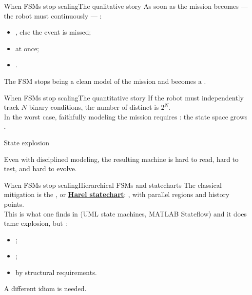 \begin{frame}{When FSMs stop scaling}{The qualitative story}
  \justifying
  As soon as the mission becomes  --- the robot must continuously  --- :
  \begin{itemize}
    \item {}, else the event is missed;
    \item {} at once;
    \item {}.
  \end{itemize}
  \bigskip
  The FSM stops being a clean model of the mission and becomes a .
\end{frame}
\begin{frame}{When FSMs stop scaling}{The quantitative story}
  \justifying
  If the robot must independently track $N$ binary conditions, the number of distinct  is $2^N$.\\
  \bigskip
  In the worst case, faithfully modeling the mission requires : the state space grows .
  \begin{alertblock}{State explosion}
    \centering
    \\
  \end{alertblock}
  \bigskip
  Even with disciplined modeling, the resulting machine is hard to read, hard to test, and hard to evolve.
\end{frame}
\begin{frame}{When FSMs stop scaling}{Hierarchical FSMs and statecharts}
  \justifying
  The classical mitigation is the , or \href{https://www.state-machine.com/doc/Harel87.pdf}{\color{blue}\underline{\textbf{Harel statechart}}}: , with parallel regions and history points.\\
  \bigskip
  This is what one finds in  (UML state machines, MATLAB Stateflow) and it does tame explosion, but :
  \begin{itemize}
    \item {};
    \item {};
    \item {} by structural requirements.
  \end{itemize}
  \bigskip
  A different idiom is needed.
\end{frame}

